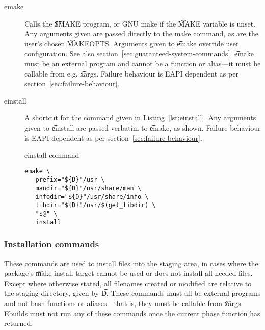 \begin{description}
\item[emake] Calls the \t{\$MAKE} program, or GNU make if the \t{MAKE} variable is unset.  Any
    arguments given are passed directly to the make command, as are the user's chosen \t{MAKEOPTS}\@.
    Arguments given to \t{emake} override user configuration. See also
    section~\ref{sec:guaranteed-system-commands}. \t{emake} must be an external program and cannot be a
    function or alias---it must be callable from e.g. \t{xargs}. Failure behaviour is EAPI dependent
    as per section~\ref{sec:failure-behaviour}.
\item[einstall] A shortcut for the command given in Listing~\ref{lst:einstall}. Any arguments given
    to \t{einstall} are passed verbatim to \t{emake}, as shown. Failure behaviour is EAPI dependent
    as per section~\ref{sec:failure-behaviour}.

\begin{listing}[H]
  \caption{einstall command}\label{lst:einstall}
  \begin{verbatim}
emake \
   prefix="${D}"/usr \
   mandir="${D}"/usr/share/man \
   infodir="${D}"/usr/share/info \
   libdir="${D}"/usr/$(get_libdir) \
   "$@" \
   install
  \end{verbatim}
\end{listing}

\end{description}

\subsubsection{Installation commands}
These commands are used to install files into the staging area, in cases where the package's \t{make
install} target cannot be used or does not install all needed files. Except where otherwise stated,
all filenames created or modified are relative to the staging directory, given by \t{D}. These
commands must all be external programs and not bash functions or aliases---that is, they must be
callable from \t{xargs}. Ebuilds must not run any of these commands once the current phase function
has returned.

